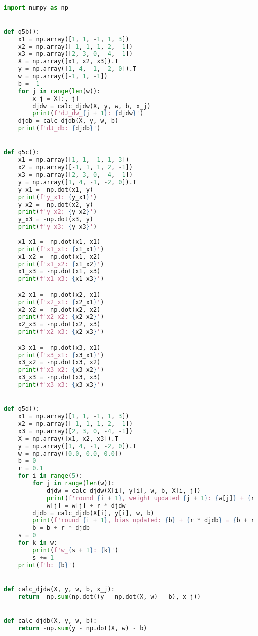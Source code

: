 \documentclass[12pt, fullpage,letterpaper]{article}
\begin{document}
\begin{enumerate}
\begin{enumerate}
	\begin{lstlisting}[language=Python, caption=QuestionAnswers.part1]

import numpy as np


def q5b():
    x1 = np.array([1, 1, -1, 1, 3])
    x2 = np.array([-1, 1, 1, 2, -1])
    x3 = np.array([2, 3, 0, -4, -1])
    X = np.array([x1, x2, x3]).T
    y = np.array([1, 4, -1, -2, 0]).T
    w = np.array([-1, 1, -1])
    b = -1
    for j in range(len(w)):
        x_j = X[:, j]
        djdw = calc_djdw(X, y, w, b, x_j)
        print(f'dJ_dw_{j + 1}: {djdw}')
    djdb = calc_djdb(X, y, w, b)
    print(f'dJ_db: {djdb}')


def q5c():
    x1 = np.array([1, 1, -1, 1, 3])
    x2 = np.array([-1, 1, 1, 2, -1])
    x3 = np.array([2, 3, 0, -4, -1])
    y = np.array([1, 4, -1, -2, 0]).T
    y_x1 = -np.dot(x1, y)
    print(f'y_x1: {y_x1}')
    y_x2 = -np.dot(x2, y)
    print(f'y_x2: {y_x2}')
    y_x3 = -np.dot(x3, y)
    print(f'y_x3: {y_x3}')
    
    x1_x1 = -np.dot(x1, x1)
    print(f'x1_x1: {x1_x1}')
    x1_x2 = -np.dot(x1, x2)
    print(f'x1_x2: {x1_x2}')
    x1_x3 = -np.dot(x1, x3)
    print(f'x1_x3: {x1_x3}')

    x2_x1 = -np.dot(x2, x1)
    print(f'x2_x1: {x2_x1}')
    x2_x2 = -np.dot(x2, x2)
    print(f'x2_x2: {x2_x2}')
    x2_x3 = -np.dot(x2, x3)
    print(f'x2_x3: {x2_x3}')

    x3_x1 = -np.dot(x3, x1)
    print(f'x3_x1: {x3_x1}')
    x3_x2 = -np.dot(x3, x2)
    print(f'x3_x2: {x3_x2}')
    x3_x3 = -np.dot(x3, x3)
    print(f'x3_x3: {x3_x3}')


def q5d():
    x1 = np.array([1, 1, -1, 1, 3])
    x2 = np.array([-1, 1, 1, 2, -1])
    x3 = np.array([2, 3, 0, -4, -1])
    X = np.array([x1, x2, x3]).T
    y = np.array([1, 4, -1, -2, 0]).T
    w = np.array([0.0, 0.0, 0.0])
    b = 0
    r = 0.1
    for i in range(5):
        for j in range(len(w)):
            djdw = calc_djdw(X[i], y[i], w, b, X[i, j])
            print(f'round {i + 1}, weight updated {j + 1}: {w[j]} + {r * djdw} = {w[j] + r * djdw}')
            w[j] = w[j] + r * djdw
        djdb = calc_djdb(X[i], y[i], w, b)
        print(f'round {i + 1}, bias updated: {b} + {r * djdb} = {b + r * djdb}')
        b = b + r * djdb
    s = 0
    for k in w:
        print(f'w_{s + 1}: {k}')
        s += 1
    print(f'b: {b}')


def calc_djdw(X, y, w, b, x_j):
    return -np.sum(np.dot((y - np.dot(X, w) - b), x_j))


def calc_djdb(X, y, w, b):
    return -np.sum(y - np.dot(X, w) - b)



\end{lstlisting}
\end{enumerate}
\end{enumerate}
\end{document}
